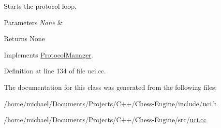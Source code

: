 Starts the protocol loop. 


\begin{DoxyParams}{Parameters}
{\em None} & \\
\hline
\end{DoxyParams}
\begin{DoxyReturn}{Returns}
None 
\end{DoxyReturn}


Implements \mbox{\hyperlink{classProtocolManager_aa3ae25a03e2f070ea486fd9319715a6a}{Protocol\+Manager}}.



Definition at line 134 of file uci.\+cc.



The documentation for this class was generated from the following files\+:\begin{DoxyCompactItemize}
\item 
/home/michael/\+Documents/\+Projects/\+C++/\+Chess-\/\+Engine/include/\mbox{\hyperlink{uci_8h}{uci.\+h}}\item 
/home/michael/\+Documents/\+Projects/\+C++/\+Chess-\/\+Engine/src/\mbox{\hyperlink{uci_8cc}{uci.\+cc}}\end{DoxyCompactItemize}
